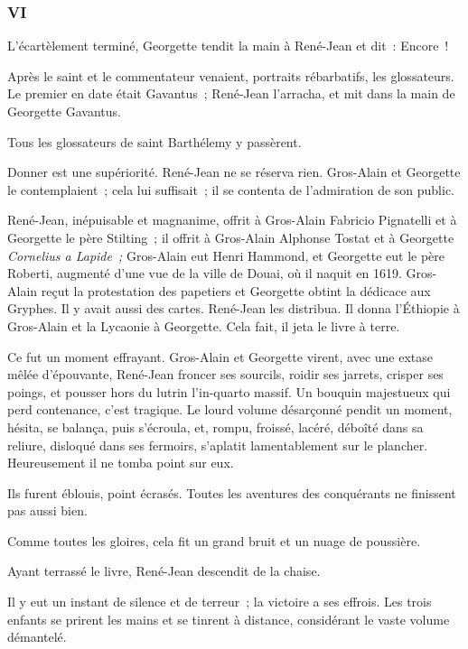 \documentclass[french,twoside]{book} %
\begin{document}
\subsubsection[{VI}]{VI}
\label{p3l3c6}
\noindent L’écartèlement terminé, Georgette tendit la main à René-Jean et dit : Encore !\par
Après le saint et le commentateur venaient, portraits rébarbatifs, les glossateurs. Le premier en date était Gavantus ; René-Jean l’arracha, et mit dans la main de Georgette Gavantus.\par
 Tous les glossateurs de saint Barthélemy y passèrent.\par
Donner est une supériorité. René-Jean ne se réserva rien. Gros-Alain et Georgette le contemplaient ; cela lui suffisait ; il se contenta de l’admiration de son public.\par
René-Jean, inépuisable et magnanime, offrit à Gros-Alain Fabricio Pignatelli et à Georgette le père Stilting ; il offrit à Gros-Alain Alphonse Tostat et à Georgette \emph{Cornelius a Lapide ;} Gros-Alain eut Henri Hammond, et Georgette eut le père Roberti, augmenté d’une vue de la ville de Douai, où il naquit en 1619. Gros-Alain reçut la protestation des papetiers et Georgette obtint la dédicace aux Gryphes. Il y avait aussi des cartes. René-Jean les distribua. Il donna l’Éthiopie à Gros-Alain et la Lycaonie à Georgette. Cela fait, il jeta le livre à terre.\par
Ce fut un moment effrayant. Gros-Alain et Georgette virent, avec une extase mêlée d’épouvante, René-Jean froncer ses sourcils, roidir ses jarrets, crisper ses poings, et pousser hors du lutrin l’in-quarto massif. Un bouquin majestueux qui perd contenance, c’est tragique. Le lourd volume désarçonné pendit un moment, hésita, se balança, puis s’écroula, et, rompu, froissé, lacéré, déboîté dans sa reliure, disloqué dans ses fermoirs, s’aplatit lamentablement sur le plancher. Heureusement il ne tomba point sur eux.\par
Ils furent éblouis, point écrasés. Toutes les aventures des conquérants ne finissent pas aussi bien.\par
 Comme toutes les gloires, cela fit un grand bruit et un nuage de poussière.\par
Ayant terrassé le livre, René-Jean descendit de la chaise.\par
Il y eut un instant de silence et de terreur ; la victoire a ses effrois. Les trois enfants se prirent les mains et se tinrent à distance, considérant le vaste volume démantelé.\par
\end{document}
